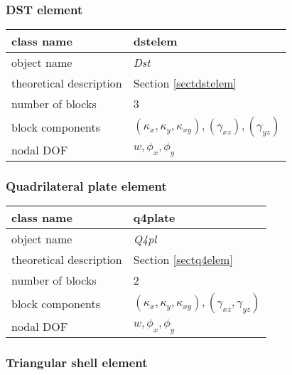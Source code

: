 \subsubsection{DST element}

\begin{center}
\begin{tabular}{|l|l|}
\hline
class name & {\sf dstelem}\index{class!{\sf dstelem}}
\\ \hline
object name & {\it Dst}\index{instance!{\it Dst}}
\\ \hline
theoretical description & Section \ref{sectdstelem}
\\ \hline
number of blocks & 3
\\ \hline
block components & $(\kappa_x,\kappa_y,\kappa_{xy}),(\gamma_{xz}),(\gamma_{yz})$
\\ \hline
nodal DOF & $w,\phi_x,\phi_y$
\\ \hline
\end{tabular}
\end{center}


\subsubsection{Quadrilateral plate element}

\begin{center}
\begin{tabular}{|l|l|}
\hline
class name & {\sf q4plate}\index{class!{\sf q4plate}}
\\ \hline
object name & {\it Q4pl}\index{instance!{\it Q4pl}}
\\ \hline
theoretical description & Section \ref{sectq4elem}
\\ \hline
number of blocks & 2
\\ \hline
block components & $(\kappa_x,\kappa_y,\kappa_{xy}),(\gamma_{xz},\gamma_{yz})$
\\ \hline
nodal DOF & $w,\phi_x,\phi_y$
\\ \hline
\end{tabular}
\end{center}

\subsubsection{Triangular shell element}

